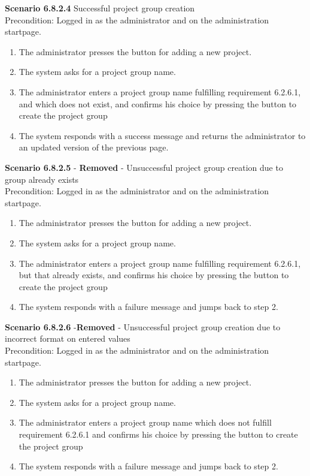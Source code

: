 \documentclass{article}
\begin{document}
\noindent\textbf{Scenario 6.8.2.4} Successful project group creation \\
Precondition: Logged in as the administrator and on the administration startpage.
\begin{enumerate}
\item The administrator presses the button for adding a new project.
\item The system asks for a project group name.
\item The administrator enters a project group name fulfilling requirement 6.2.6.1, and which does not exist, and confirms his choice by pressing the button to create the project group
\item The system responds with a success message and returns the administrator to an updated version of the previous page.
\end{enumerate}

\noindent\textbf{Scenario 6.8.2.5} - \textbf{Removed} - Unsuccessful project group creation due to group already exists \\
Precondition: Logged in as the administrator and on the administration startpage.
\begin{enumerate}
\item The administrator presses the button for adding a new project.
\item The system asks for a project group name.
\item The administrator enters a project group name fulfilling requirement 6.2.6.1, but that already exists, and confirms his choice by pressing the button to create the project group
\item The system responds with a failure message and jumps back to step 2.
\end{enumerate}

\noindent\textbf{Scenario 6.8.2.6} -\textbf{Removed} - Unsuccessful project group creation due to incorrect format on entered values\\
Precondition: Logged in as the administrator and on the administration startpage.
\begin{enumerate}
\item The administrator presses the button for adding a new project.
\item The system asks for a project group name.
\item The administrator enters a project group name which does not fulfill requirement 6.2.6.1 and confirms his choice by pressing the button to create the project group
\item The system responds with a failure message and jumps back to step 2.
\end{enumerate}
\end{document}
